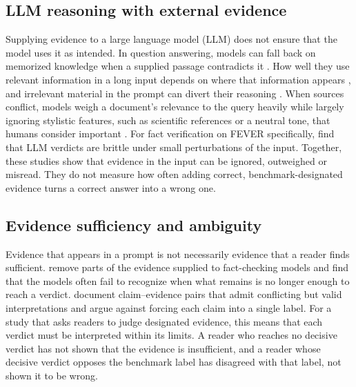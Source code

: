 \subsection{LLM reasoning with external evidence}
Supplying evidence to a large language model (LLM) does not ensure that the model uses it as intended.
In question answering, models can fall back on memorized knowledge when a supplied passage contradicts it \citep{longpre-etal-2021-entity}.
How well they use relevant information in a long input depends on where that information appears \citep{liu-etal-2024-lost}, and irrelevant material in the prompt can divert their reasoning \citep{shi2023distracted}.
When sources conflict, models weigh a document's relevance to the query heavily while largely ignoring stylistic features, such as scientific references or a neutral tone, that humans consider important \citep{wan-etal-2024-evidence}.
For fact verification on FEVER specifically, \citet{mamta-cocarascu-2025-facteval} find that LLM verdicts are brittle under small perturbations of the input.
Together, these studies show that evidence in the input can be ignored, outweighed or misread.
They do not measure how often adding correct, benchmark-designated evidence turns a correct answer into a wrong one.

\subsection{Evidence sufficiency and ambiguity}
Evidence that appears in a prompt is not necessarily evidence that a reader finds sufficient.
\citet{atanasova-etal-2022-fact} remove parts of the evidence supplied to fact-checking models and find that the models often fail to recognize when what remains is no longer enough to reach a verdict.
\citet{glockner-etal-2024-ambifc} document claim--evidence pairs that admit conflicting but valid interpretations and argue against forcing each claim into a single label.
For a study that asks readers to judge designated evidence, this means that each verdict must be interpreted within its limits.
A reader who reaches no decisive verdict has not shown that the evidence is insufficient, and a reader whose decisive verdict opposes the benchmark label has disagreed with that label, not shown it to be wrong.


